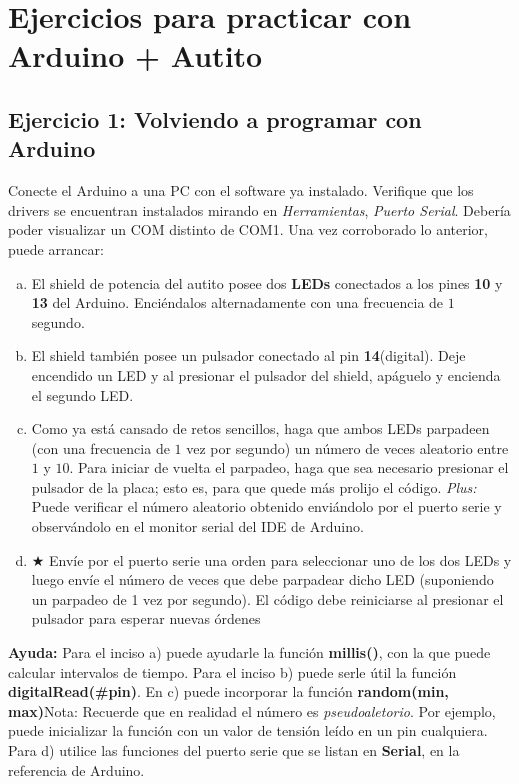 \documentclass[a4paper,10pt]{article}
\begin{document}
\section{Ejercicios para practicar con Arduino + Autito}

\subsection*{Ejercicio 1: Volviendo a programar con Arduino}

Conecte el Arduino a una PC con el software ya instalado. Verifique que los drivers se encuentran instalados mirando en \emph{Herramientas}, \emph{Puerto Serial}. Debería poder visualizar un COM distinto de COM1. Una vez corroborado lo anterior, puede arrancar:
\begin{enumerate}[(a)]
	\item El shield de potencia del autito posee dos \textbf{LEDs} conectados a los pines \textbf{10} y \textbf{13} del Arduino. Enciéndalos alternadamente con una frecuencia de $1$ segundo. 
	\item El shield también posee un pulsador conectado al pin \textbf{14}(digital). Deje encendido un LED y al presionar el pulsador del shield, apáguelo y encienda el segundo LED.
	\item Como ya está cansado de retos sencillos, haga que ambos LEDs parpadeen (con una frecuencia de $1$ vez por segundo) un número de veces aleatorio entre $1$ y $10$. Para iniciar de vuelta el parpadeo, haga que sea necesario presionar el pulsador de la placa; esto es, para que quede más prolijo el código. \emph{Plus:} Puede verificar el número aleatorio obtenido enviándolo por el puerto serie y observándolo en el monitor serial del IDE de Arduino.
	\item $\bigstar$ Envíe por el puerto serie una orden para seleccionar uno de los dos LEDs y luego envíe el número de veces que debe parpadear dicho LED (suponiendo un parpadeo de 1 vez por segundo). El código debe reiniciarse al presionar el pulsador para esperar nuevas órdenes
\end{enumerate}

\textbf{Ayuda:} Para el inciso a) puede ayudarle la función \textbf{millis()}, con la que puede calcular intervalos de tiempo. Para el inciso b) puede serle útil la función \textbf{digitalRead(\#pin)}. En c) puede incorporar la función \textbf{random(min, max)}Nota: Recuerde que en realidad el número es \textit{pseudoaletorio}. Por ejemplo, puede inicializar la función con un valor de tensión leído en un pin cualquiera. Para d) utilice las funciones del puerto serie que se listan en \textbf{Serial}, en la referencia de Arduino.
\end{document}
